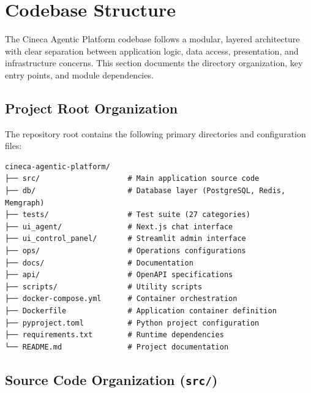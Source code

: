 
\section{Codebase Structure}
\label{sec:codebase}

The Cineca Agentic Platform codebase follows a modular, layered architecture with clear separation between application logic, data access, presentation, and infrastructure concerns. This section documents the directory organization, key entry points, and module dependencies.

\subsection{Project Root Organization}

The repository root contains the following primary directories and configuration files:

\begin{verbatim}
cineca-agentic-platform/
├── src/                    # Main application source code
├── db/                     # Database layer (PostgreSQL, Redis, Memgraph)
├── tests/                  # Test suite (27 categories)
├── ui_agent/               # Next.js chat interface
├── ui_control_panel/       # Streamlit admin interface
├── ops/                    # Operations configurations
├── docs/                   # Documentation
├── api/                    # OpenAPI specifications
├── scripts/                # Utility scripts
├── docker-compose.yml      # Container orchestration
├── Dockerfile              # Application container definition
├── pyproject.toml          # Python project configuration
├── requirements.txt        # Runtime dependencies
└── README.md               # Project documentation
\end{verbatim}

\subsection{Source Code Organization (\texttt{src/})}

